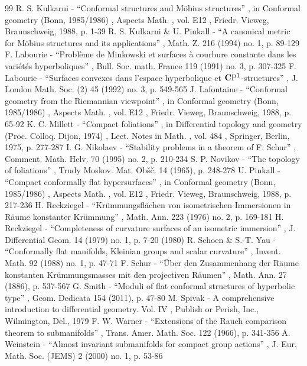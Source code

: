 \documentclass[10pt]{amsart}
\theoremstyle{definition}
\theoremstyle{remark}
\numberwithin{equation}{section}
\begin{document}
\begin{thebibliography}{99}
 R. S. Kulkarni - “Conformal structures and Möbius structures” , in Conformal geometry (Bonn, 1985/1986) , Aspects Math. , vol. E12 , Friedr. Vieweg, Braunschweig, 1988, p. 1-39
 R. S. Kulkarni \& U. Pinkall - “A canonical metric for Möbius structures and its applications” , Math. Z. 216 (1994) no. 1, p. 89-129
 F. Labourie - “Problème de Minkowski et surfaces à courbure constante dans les variétés hyperboliques” , Bull. Soc. math. France 119 (1991) no. 3, p. 307-325
 F. Labourie - “Surfaces convexes dans l’espace hyperbolique et ${\bf C}{\rm P}^1$-structures” , J. London Math. Soc. (2) 45 (1992) no. 3, p. 549-565
 J. Lafontaine - “Conformal geometry from the Riemannian viewpoint” , in Conformal geometry (Bonn, 1985/1986) , Aspects Math. , vol. E12 , Friedr. Vieweg, Braunschweig, 1988, p. 65-92
 K. C. Millett - “Compact foliations” , in Differential topology and geometry (Proc. Colloq. Dijon, 1974) , Lect. Notes in Math. , vol. 484 , Springer, Berlin, 1975, p. 277-287
 I. G. Nikolaev - “Stability problems in a theorem of F. Schur” , Comment. Math. Helv. 70 (1995) no. 2, p. 210-234
 S. P. Novikov - “The topology of foliations” , Trudy Moskov. Mat. Obšč. 14 (1965), p. 248-278
 U. Pinkall - “Compact conformally flat hypersurfaces” , in Conformal geometry (Bonn, 1985/1986) , Aspects Math. , vol. E12 , Friedr. Vieweg, Braunschweig, 1988, p. 217-236
 H. Reckziegel - “Krümmungsflächen von isometrischen Immersionen in Räume konstanter Krümmung” , Math. Ann. 223 (1976) no. 2, p. 169-181
 H. Reckziegel - “Completeness of curvature surfaces of an isometric immersion” , J. Differential Geom. 14 (1979) no. 1, p. 7-20 (1980)
 R. Schoen \& S.-T. Yau - “Conformally flat manifolds, Kleinian groups and scalar curvature” , Invent. Math. 92 (1988) no. 1, p. 47-71
 F. Schur - “Über den Zusammenhang der Räume konstanten Krümmungsmasses mit den projectiven Räumen” , Math. Ann. 27 (1886), p. 537-567
 G. Smith - “Moduli of flat conformal structures of hyperbolic type” , Geom. Dedicata 154 (2011), p. 47-80
 M. Spivak - A comprehensive introduction to differential geometry. Vol. IV , Publish or Perish, Inc., Wilmington, Del., 1979
 F. W. Warner - “Extensions of the Rauch comparison theorem to submanifolds” , Trans. Amer. Math. Soc. 122 (1966), p. 341-356
 A. Weinstein - “Almost invariant submanifolds for compact group actions” , J. Eur. Math. Soc. (JEMS) 2 (2000) no. 1, p. 53-86
\end{thebibliography}
\end{document}
